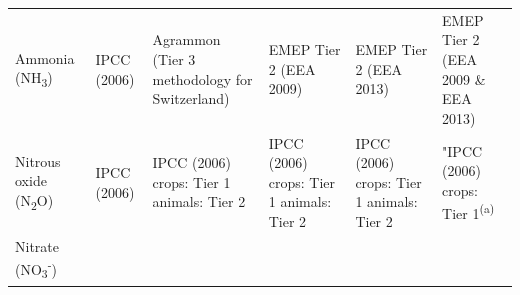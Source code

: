 \documentclass[openany]{book}
\begin{document}
\begin{longtable}[]{@{}llllll@{}}
\begin{minipage}[b]{0.17\columnwidth}
\end{minipage}\tabularnewline
\midrule
\endhead
\begin{minipage}[t]{0.12\columnwidth}\raggedright
Ammonia (NH\textsubscript{3})\strut
\end{minipage} & \begin{minipage}[t]{0.16\columnwidth}\raggedright
IPCC (2006)\strut
\end{minipage} & \begin{minipage}[t]{0.12\columnwidth}\raggedright
Agrammon (Tier 3 methodology for Switzerland)\strut
\end{minipage} & \begin{minipage}[t]{0.13\columnwidth}\raggedright
EMEP Tier 2 (EEA 2009)\strut
\end{minipage} & \begin{minipage}[t]{0.12\columnwidth}\raggedright
EMEP Tier 2 (EEA 2013)\strut
\end{minipage} & \begin{minipage}[t]{0.17\columnwidth}\raggedright
EMEP Tier 2 (EEA 2009 \& EEA 2013)\strut
\end{minipage}\tabularnewline
\begin{minipage}[t]{0.12\columnwidth}\raggedright
Nitrous oxide (N\textsubscript{2}O)\strut
\end{minipage} & \begin{minipage}[t]{0.16\columnwidth}\raggedright
IPCC (2006)\strut
\end{minipage} & \begin{minipage}[t]{0.12\columnwidth}\raggedright
IPCC (2006) crops: Tier 1 animals: Tier 2\strut
\end{minipage} & \begin{minipage}[t]{0.13\columnwidth}\raggedright
IPCC (2006) crops: Tier 1 animals: Tier 2\strut
\end{minipage} & \begin{minipage}[t]{0.12\columnwidth}\raggedright
IPCC (2006) crops: Tier 1 animals: Tier 2\strut
\end{minipage} & \begin{minipage}[t]{0.17\columnwidth}\raggedright
"IPCC (2006) crops: Tier 1\textsuperscript{(a)}\strut
\end{minipage}\tabularnewline
\begin{minipage}[t]{0.12\columnwidth}\raggedright
Nitrate (NO\textsubscript{3}\textsuperscript{-})\strut
\end{minipage} & \begin{minipage}[t]{0.16\columnwidth}\raggedright

\end{minipage}
\end{longtable}
\end{document}
